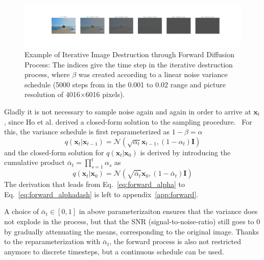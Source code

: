 \begin{figure}[h]
    \centering
    \includegraphics[width=\textwidth]{images/forward_naoshima.png}
    \caption[Example of Iterative Image Destruction through Forward Diffusion Process]{Example of Iterative Image Destruction through Forward Diffusion Process:
        The indices give the time step in the iterative destruction process, where $\beta$ was created according to a linear noise variance schedule (5000 steps from in the 0.001 to 0.02 range and picture resolution of 4016$\times$6016 pixels).}
    \label{fig:forward_naoshima}
\end{figure}

Gladly it is not necessary to sample noise again and again in order to arrive at $\bm{x}_t$, since Ho et al. derived a closed-form solution to the sampling procedure.~\autocite{ho2020denoising} For this, the variance schedule is first reparameterized as $1-\beta = \alpha$
\begin{equation}
    q(\bm{x}_t | \bm{x}_{t-1}) = \mathcal{N}(\sqrt{\alpha_t} \bm{x}_{t-1}, (1-\alpha_t) \bm{I})
    \label{eq:forward_alpha}
\end{equation}
and the closed-form solution for $q(\bm{x}_t|\bm{x}_0)$ is derived by introducing the cumulative product $\bar{\alpha}_t = \prod_{s=1}^{t}\alpha_s$ as
\begin{equation}
    q(\bm{x}_t|\bm{x}_0) = \mathcal{N}(\sqrt{\bar{\alpha}_t}\bm{x}_0, (1-\bar{\alpha}_t)\bm{I})
    \label{eq:forward_alphadash}
\end{equation}
The derivation that leads from Eq.~\ref{eq:forward_alpha} to Eq.~\ref{eq:forward_alphadash} is left to appendix~\ref{app:forward}.

A choice of $\bar{\alpha}_t \in [0,1]$ in above parameterizaiton ensures that the variance does not explode in the process, but that the SNR (signal-to-noise-ratio) still goes to 0 by gradually attenuating the means, corresponding to the original image. Thanks to the reparameterization with $\bar{\alpha}_t$, the forward process is also not restricted anymore to discrete timesteps, but a continuous schedule can be used.~\autocite{kingma2023variational,song2021scorebased}

